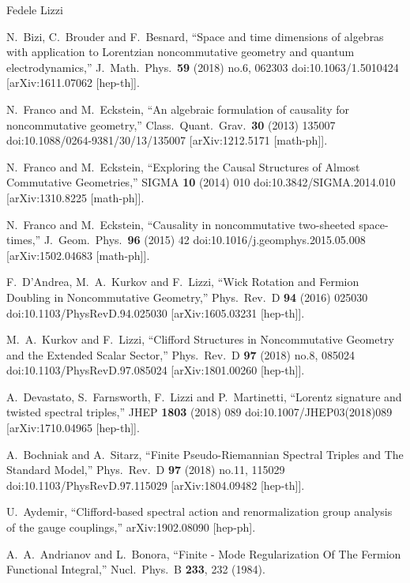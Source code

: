 \begin{artengenv}{Fedele Lizzi}
\begin{thebibliography}{99}
  N.~Bizi, C.~Brouder and F.~Besnard,
  ``Space and time dimensions of algebras with application to Lorentzian noncommutative geometry and quantum electrodynamics,''
  J.\ Math.\ Phys.\  {\bf 59} (2018) no.6,  062303
  doi:10.1063/1.5010424
  [arXiv:1611.07062 [hep-th]].

  N.~Franco and M.~Eckstein,
  ``An algebraic formulation of causality for noncommutative geometry,''
  Class.\ Quant.\ Grav.\  {\bf 30} (2013) 135007
  doi:10.1088/0264-9381/30/13/135007
  [arXiv:1212.5171 [math-ph]].

  N.~Franco and M.~Eckstein,
  ``Exploring the Causal Structures of Almost Commutative Geometries,''
  SIGMA {\bf 10} (2014) 010
  doi:10.3842/SIGMA.2014.010
  [arXiv:1310.8225 [math-ph]].
  
  N.~Franco and M.~Eckstein,
  ``Causality in noncommutative two-sheeted space-times,''
  J.\ Geom.\ Phys.\  {\bf 96} (2015) 42
  doi:10.1016/j.geomphys.2015.05.008
  [arXiv:1502.04683 [math-ph]].
 
  F.~D'Andrea, M.~A.~Kurkov and F.~Lizzi,
  ``Wick Rotation and Fermion Doubling in Noncommutative Geometry,''
  Phys.\ Rev.\ D {\bf 94} (2016) 025030
  doi:10.1103/PhysRevD.94.025030
  [arXiv:1605.03231 [hep-th]].

  M.~A.~Kurkov and F.~Lizzi,
  ``Clifford Structures in Noncommutative Geometry and the Extended Scalar Sector,''
  Phys.\ Rev.\ D {\bf 97} (2018) no.8,  085024
  doi:10.1103/PhysRevD.97.085024
  [arXiv:1801.00260 [hep-th]].

  A.~Devastato, S.~Farnsworth, F.~Lizzi and P.~Martinetti,
  ``Lorentz signature and twisted spectral triples,''
  JHEP {\bf 1803} (2018) 089
  doi:10.1007/JHEP03(2018)089
  [arXiv:1710.04965 [hep-th]].

  A.~Bochniak and A.~Sitarz,
  ``Finite Pseudo-Riemannian Spectral Triples and The Standard Model,''
  Phys.\ Rev.\ D {\bf 97} (2018) no.11,  115029
  doi:10.1103/PhysRevD.97.115029
  [arXiv:1804.09482 [hep-th]].
  
  U.~Aydemir,
  ``Clifford-based spectral action and renormalization group analysis of the gauge couplings,''
  arXiv:1902.08090 [hep-ph].

  A.~A.~Andrianov and L.~Bonora,
  ``Finite - Mode Regularization Of The Fermion Functional Integral,''
  Nucl.\ Phys.\  B {\bf 233}, 232 (1984).


\end{thebibliography}
\end{artengenv}
